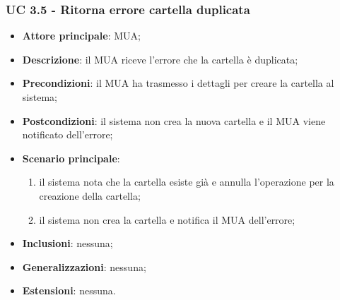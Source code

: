 \subsubsection{UC 3.5 - Ritorna errore cartella duplicata} \label{sec:UC3.5}
    \begin{itemize}
        \item \textbf{Attore principale}: MUA;
        \item \textbf{Descrizione}: il MUA riceve l'errore che la cartella è duplicata;
        \item \textbf{Precondizioni}: il MUA ha trasmesso i dettagli per creare la cartella al sistema;
        \item \textbf{Postcondizioni}: il sistema non crea la nuova cartella e il MUA viene notificato dell'errore;
        \item \textbf{Scenario principale}:
            \begin{enumerate}
                \item il sistema nota che la cartella esiste già e annulla l'operazione per la creazione della cartella;
                \item il sistema non crea la cartella e notifica il MUA dell'errore;
            \end{enumerate}
        \item \textbf{Inclusioni}: nessuna;
        \item \textbf{Generalizzazioni}: nessuna;
        \item \textbf{Estensioni}: nessuna.
    \end{itemize}

